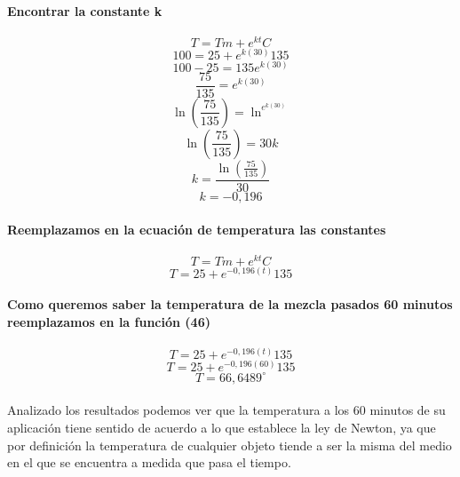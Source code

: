 \documentclass{article}
\begin{document}
\paragraph{Encontrar la constante k}
\begin{equation}
T=Tm + e^{kt}C
\end{equation}
\begin{equation}
100=25 + e^{k(30)}135
\end{equation}
\begin{equation}
100-25= 135e^{k(30)}
\end{equation}
\begin{equation}
\frac{75}{135}= e^{k(30)}
\end{equation}
\begin{equation}
\ln(\frac{75}{135})=\ln ^{e^{k(30)}}
\end{equation}
\begin{equation}
\ln(\frac{75}{135})=30k
\end{equation}
\begin{equation}
k=\frac{\ln(\frac{75}{135})}{30}
\end{equation}
\begin{equation}
k=-0,196
\end{equation}
\paragraph{Reemplazamos en la ecuación de temperatura las constantes}
\begin{equation}
T=Tm + e^{kt}C
\end{equation}
\begin{equation}
T=25 + e^{-0,196(t)}135
\end{equation}
\paragraph{Como queremos saber la temperatura de la mezcla pasados 60 minutos reemplazamos en la función (46)}
\begin{equation}
T=25 + e^{-0,196(t)}135
\end{equation}
\begin{equation}
T=25 + e^{-0,196(60)}135
\end{equation}
\begin{equation}
T=66,6489^{\circ}
\end{equation}\\
Analizado los resultados podemos ver que la temperatura a los 60 minutos de su aplicación tiene sentido de acuerdo a lo que establece la ley de Newton, ya que por definición la temperatura de cualquier objeto tiende a ser la misma del medio en el que se encuentra a medida que pasa el tiempo.
\end{document}
